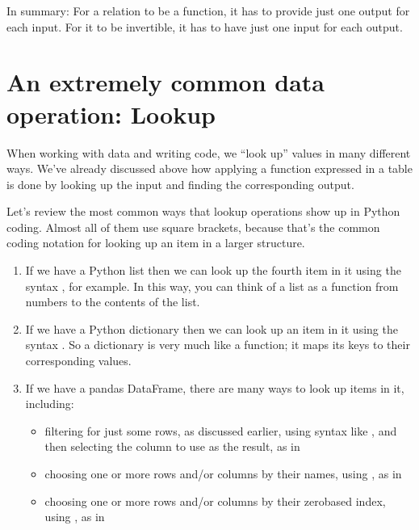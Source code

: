 \documentclass[letterpaper,10pt,english]{jupyterBook}
\begin{document}
\sphinxAtStartPar
In summary:  For a relation to be a function, it has to provide just one output for each input.  For it to be invertible, it has to have just one input for each output.


\section{An extremely common data operation: Lookup}
\label{\detokenize{chapter-2-mathematical-foundations:an-extremely-common-data-operation-lookup}}
\sphinxAtStartPar
When working with data and writing code, we “look up” values in many different ways.  We’ve already discussed above how applying a function expressed in a table is done by looking up the input and finding the corresponding output.

\sphinxAtStartPar
Let’s review the most common ways that lookup operations show up in Python coding.  Almost all of them use square brackets, because that’s the common coding notation for looking up an item in a larger structure.
\begin{enumerate}
%
\item {} 
\sphinxAtStartPar
If we have a Python list  then we can look up the fourth item in it using the syntax , for example.  In this way, you can think of a list as a function from numbers to the contents of the list.

\item {} 
\sphinxAtStartPar
If we have a Python dictionary  then we can look up an item in it using the syntax .  So a dictionary is very much like a function; it maps its keys to their corresponding values.

\item {} 
\sphinxAtStartPar
If we have a pandas DataFrame, there are many ways to look up items in it, including:
\begin{itemize}
\item {} 
\sphinxAtStartPar
filtering for just some rows, as discussed earlier, using syntax like , and then selecting the column to use as the result, as in 

\item {} 
\sphinxAtStartPar
choosing one or more rows and/or columns by their names, using , as in 

\item {} 
\sphinxAtStartPar
choosing one or more rows and/or columns by their zero\sphinxhyphen{}based index, using , as in 

\end{itemize}

\end{enumerate}
\end{document}
